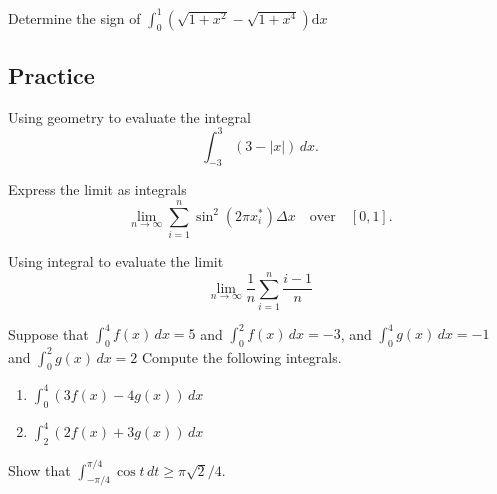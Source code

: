 \begin{example}

Determine the sign of
\(\int_0^1(\sqrt{1+x^2}-\sqrt{1+x^4})\mathrm{d} x\)

\end{example}
\vspace*{6\baselineskip}

\subsection{Practice}

\begin{exercise}

Using geometry to evaluate the integral
\[\displaystyle \int^3_{ - 3}(3 - |x|)\,dx.\]

\end{exercise}
\vspace*{6\baselineskip}

\begin{exercise}

Express the limit as integrals
\[\displaystyle \lim_{n\to\infty}\sum_{i=1}^n\sin^2(2\pi x^*_i)\Delta x\quad \text{over}\quad [0,1].\]

\end{exercise}
\vspace*{6\baselineskip}

\begin{exercise}

Using integral to evaluate the limit
\[\displaystyle \lim\limits_{n\to \infty}\frac{1}{n}\sum_{i=1}^n\frac{i - 1}{n}\]

\end{exercise}
\vspace*{6\baselineskip}

\begin{exercise}

Suppose that \(\displaystyle \int^4_0f(x)\,dx=5\) and
\(\displaystyle \int^2_0f(x)\,dx= - 3\), and
\(\displaystyle \int^4_0g(x)\,dx= - 1\) and
\(\displaystyle \int^2_0g(x)\,dx=2\) Compute the following integrals.

\begin{enumerate}
\item
  \(\displaystyle \int^4_0(3f(x) - 4g(x))\,dx\)
\item
  \(\displaystyle \int^4_2(2f(x)+3g(x))\,dx\)
\end{enumerate}

\end{exercise}

\begin{exercise}

Show that
\(\displaystyle \int^{\pi/4}_{ - \pi/4}\cos t\,dt \ge \pi\sqrt{2}/4\).

\end{exercise}

